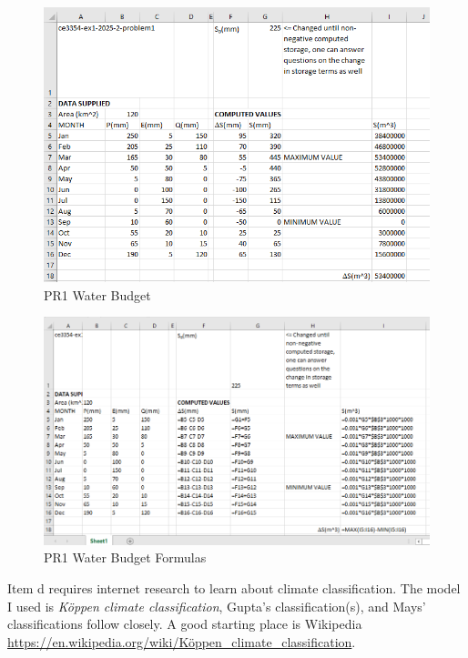 \documentclass[12pt]{article}
\begin{document}
\begin{enumerate}
\begin{figure}[h!] %
   \centering
   \includegraphics[width=6in]{pr1_xls.png} 
   \caption{PR1 Water Budget}
   \label{fig:pr1_xls}
\end{figure}

\begin{figure}[h!] %
   \centering
   \includegraphics[width=6in]{pr1_form.png} 
   \caption{PR1 Water Budget Formulas}
   \label{fig:pr1_form}
\end{figure}

\clearpage
Item d requires internet research to learn about climate classification.  The model I used is \textsl{Köppen climate classification}, Gupta's classification(s), and Mays' classifications follow closely.  A good starting place is Wikipedia \url{https://en.wikipedia.org/wiki/Köppen_climate_classification}.


\end{enumerate}
\end{document}
